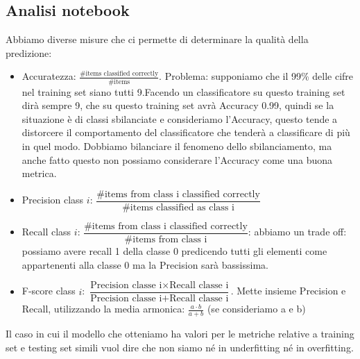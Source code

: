\documentclass[12pt, oneside]{extbook}
\begin{document}
\subsection{Analisi notebook}
Abbiamo diverse misure che ci permette di determinare la qualità della predizione:
\begin{itemize}
	\item Accuratezza: $\frac{\text{\# items classified correctly}}{\text{\# items}}$. Problema: supponiamo che il 99\% delle cifre nel training set siano tutti 9.Facendo un classificatore su questo training set dirà sempre 9, che su questo training set avrà Accuracy 0.99, quindi se la situazione è di classi sbilanciate e consideriamo l'Accuracy, questo tende a distorcere il comportamento del classificatore che tenderà a classificare di più in quel modo. Dobbiamo bilanciare il fenomeno dello sbilanciamento, ma anche fatto questo non possiamo considerare l'Accuracy come una buona metrica.
	\item Precision class $i$: $\dfrac{\text{\# items from class i classified correctly}}{\text{\# items classified as class i}}$
	
	\item Recall class $i$: $\dfrac{\text{\# items from class i classified correctly}}{\text{\# items from class i}}$: abbiamo un trade off: possiamo avere recall 1 della classe 0 predicendo tutti gli elementi come appartenenti alla classe 0 ma la Precision sarà bassissima.
	
	\item F-score class $i$: $\dfrac{\text{Precision classe i} \times \text{Recall classe i}}{\text{Precision classe i}+\text{Recall classe i}}$. Mette insieme Precision e Recall, utilizzando la media armonica: $\frac{a\cdot b}{a + b}$ (se consideriamo a e b)
\end{itemize}
Il caso in cui il modello che otteniamo ha valori per le metriche relative a training set e testing set simili  vuol dire che non siamo né in underfitting né in overfitting.
\end{document}
